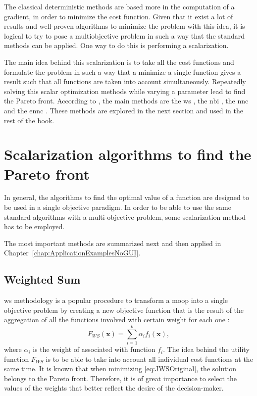 The classical deterministic methods are based more in the computation of a gradient, in order to minimize the cost function. Given that it exist a lot of results and well-proven algorithms to minimize the problem with this idea, it is logical to try to pose a multiobjective problem in such a way that the standard methods can be applied. One way to do this is performing a scalarization.

The main idea behind this scalarization is to take all the cost functions and formulate the problem in such a way that a minimize a single function gives a result such that all functions are taken into account simultaneously. Repeatedly solving this scalar optimization methods while varying a parameter lead to find the Pareto front. According to \citet{Marler2004}, the main methods are the \gls{ws} , the \gls{nbi} \citep{Das1998}, the \gls{nnc} \citep{Messac2003} and the \gls{ennc} \citep{Sanchis2008}. These methods are explored in the next section and used in the rest of the book.
\section{Scalarization algorithms to find the Pareto front}
\label{sec:design-methodologies}

In general, the algorithms to find the optimal value of a function are designed to be used in a single objective paradigm. In order to be able to use the same standard algorithms with a multi-objective problem, some scalarization method has to be employed.

The most important methods are summarized next and then applied in Chapter~\ref{chap:ApplicationExamplesNoGUI}.

\subsection{Weighted Sum}
\label{sec:WS}
\gls{ws} methodology is a popular procedure to transform a \gls{moop} into a single objective problem by creating a new objective function that is the result of the aggregation of all the functions involved with certain weight for each one \citep{Marler2004}:
%
\begin{equation}
F_{WS}(\mathbf{x}) = \sum_{i=1}^{k}\alpha_{i} {f}_{i}(\mathbf{x}),
\label{eq:JWSOriginal}
\end{equation}
%
where $\alpha_i$ is the weight of associated with function $f_i$. The idea behind the utility function $F_{WS}$ is to be able to take into account all individual cost functions at the same time. It is known that when minimizing \eqref{eq:JWSOriginal}, the solution belongs to the Pareto front. Therefore, it is of great importance to select the values of the weights that better reflect the desire of the decision-maker.

